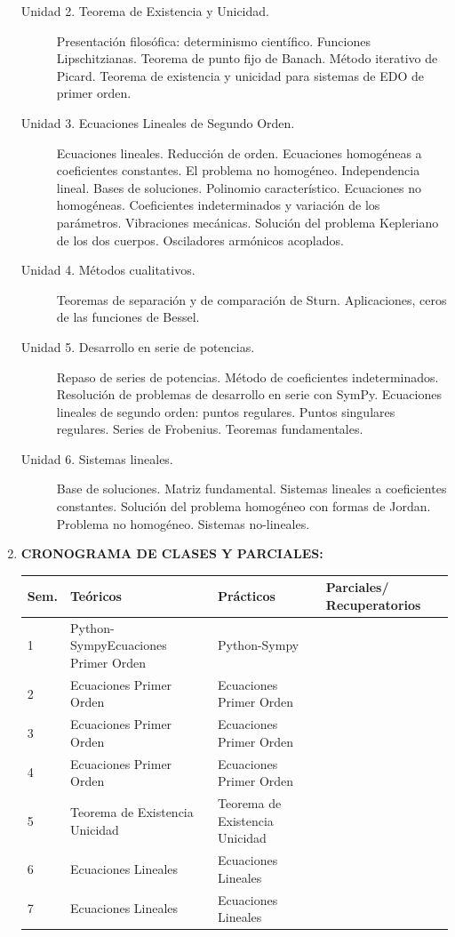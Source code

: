 \documentclass[12pt]{article}
\begin{document}
\begin{enumerate}
\begin{description}
\item[Unidad 2. Teorema de Existencia y Unicidad.] Presentación filosófica: determinismo científico. Funciones Lipschitzianas. Teorema de punto fijo de Banach. Método iterativo de Picard. Teorema de existencia y unicidad para sistemas de EDO de primer orden.\cite{simmons_esp, WilliamE.Boyce496, VladimirI.Arnold544, JorgeSotomayor513}

\item[Unidad 3. Ecuaciones Lineales de Segundo Orden.] Ecuaciones lineales. Reducción de orden. Ecuaciones homogéneas a coeficientes constantes. El problema no homogéneo. Independencia lineal. Bases de soluciones. Polinomio característico. Ecuaciones no homogéneas. Coeficientes indeterminados y variación de los parámetros. Vibraciones mecánicas. Solución del problema Kepleriano de los dos cuerpos. Osciladores armónicos acoplados.

\item[Unidad 4. Métodos cualitativos.] Teoremas de separación y de comparación de Sturn. Aplicaciones, ceros de las funciones de Bessel.

\item[Unidad 5. Desarrollo en serie de potencias.] Repaso de series de potencias. Método de coeficientes indeterminados.  Resolución de problemas de desarrollo en serie con  SymPy.   Ecuaciones lineales de segundo orden: puntos regulares. Puntos singulares regulares. Series de Frobenius. Teoremas fundamentales.

\item[Unidad 6.  Sistemas lineales.]  Base de soluciones. Matriz fundamental. Sistemas lineales a coeficientes constantes. Solución del problema homogéneo con formas de Jordan. Problema no homogéneo. Sistemas no-lineales.

\end{description}

\item\textbf{CRONOGRAMA DE CLASES Y PARCIALES:}
\begin{table}[h]
\begin{tabular}{|m{0.6cm} |m{5cm}|m{5cm}|m{4.8cm}|}\hline
Sem.  & Teóricos & Prácticos & Parciales/ Recuperatorios\\\hline \hline
1   & Python-Sympy\newline Ecuaciones Primer Orden  &  Python-Sympy &   \\ \hline
  2 &  Ecuaciones Primer Orden  & Ecuaciones Primer Orden  &   \\ \hline
  3 &  Ecuaciones Primer Orden    &  Ecuaciones Primer Orden &   \\ \hline
   4 &  Ecuaciones Primer Orden    &  Ecuaciones Primer Orden &   \\ \hline
  5 & Teorema de Existencia Unicidad  &  Teorema de Existencia Unicidad   &   \\ \hline
  6 &   Ecuaciones Lineales   &  Ecuaciones Lineales   &   \\ \hline
  7 &  Ecuaciones Lineales   &  Ecuaciones Lineales &   \\ \hline


\end{tabular}
\end{table}
\end{enumerate}
\end{document}
